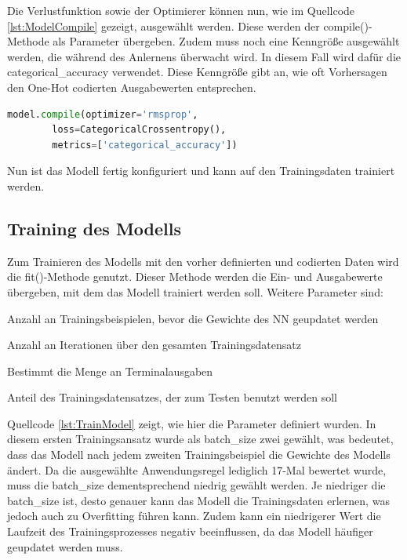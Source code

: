 Die Verlustfunktion sowie der Optimierer können nun, wie im Quellcode \ref*{lst:ModelCompile} gezeigt, ausgewählt werden. Diese werden der compile()-Methode als Parameter übergeben.
Zudem muss noch eine Kenngröße ausgewählt werden, die während des Anlernens überwacht wird. In diesem Fall wird dafür die \glqq categorical\_accuracy\grqq{} verwendet.
Diese Kenngröße gibt an, wie oft Vorhersagen den One-Hot codierten Ausgabewerten entsprechen.

\begin{lstlisting}[language = python, caption={Auswahl des Optimierers sowie der Verlustfunktion},captionpos=b, label = lst:ModelCompile, float, floatplacement=H]
    model.compile(optimizer='rmsprop',
        loss=CategoricalCrossentropy(),
        metrics=['categorical_accuracy'])
\end{lstlisting}

Nun ist das Modell fertig konfiguriert und kann auf den Trainingsdaten trainiert werden.

\subsection{Training des Modells}
\label{chap:TrainNN}

Zum Trainieren des Modells mit den vorher definierten und codierten Daten wird die fit()-Methode genutzt. Dieser Methode werden die Ein- und Ausgabewerte übergeben, mit dem das Modell trainiert werden soll.
Weitere Parameter sind:
\begin{description}[style=multiline,leftmargin=3cm,font=\bfseries, nolistsep]
    \item[batch\_size] Anzahl an Trainingsbeispielen, bevor die Gewichte des \ac{NN} geupdatet werden \cite{KerasDoc}
    \item[epochs] Anzahl an Iterationen über den gesamten Trainingsdatensatz \cite{KerasDoc}
    \item[verbose] Bestimmt die Menge an Terminalausgaben \cite{KerasDoc}
    \item[validation\_split] Anteil des Trainingsdatensatzes, der zum Testen benutzt werden soll \cite{KerasDoc}
\end{description} 
Quellcode \ref*{lst:TrainModel} zeigt, wie hier die Parameter definiert wurden. In diesem ersten Trainingsansatz wurde als \glqq batch\_size\grqq{} zwei gewählt, was bedeutet, dass das Modell
nach jedem zweiten Trainingsbeispiel die Gewichte des Modells ändert. Da die ausgewählte Anwendungsregel lediglich 17-Mal bewertet wurde, muss die \glqq batch\_size\grqq{} dementsprechend niedrig gewählt
werden. Je niedriger die \glqq batch\_size\grqq{} ist, desto genauer kann das Modell die Trainingsdaten erlernen, was jedoch auch zu Overfitting führen kann. Zudem kann ein niedrigerer Wert 
die Laufzeit des Trainingsprozesses negativ beeinflussen, da das Modell häufiger geupdatet werden muss.

